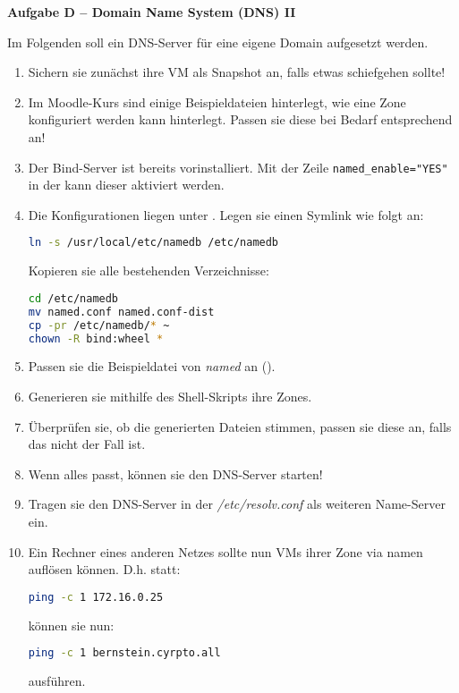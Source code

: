 \documentclass[paper=a4,fontsize=11pt]{scrartcl}%
\numberwithin{equation}{section}
\begin{document}
\begin{center}\Large{\textbf{Aufgabe D -- Domain Name System (DNS) II}}\end{center}\vskip0.25in
Im Folgenden soll ein DNS-Server für eine eigene Domain aufgesetzt werden.
\begin{enumerate}
	\item Sichern sie zunächst ihre VM als Snapshot an, falls etwas schiefgehen sollte!
	\item Im Moodle-Kurs sind einige Beispieldateien hinterlegt, wie eine Zone konfiguriert werden kann hinterlegt. Passen sie diese bei Bedarf entsprechend an!
	\item Der Bind-Server ist bereits vorinstalliert. Mit der Zeile \texttt{named\_enable="YES"} in der  kann dieser aktiviert werden.
	\item Die Konfigurationen liegen unter . Legen sie einen Symlink wie folgt an:
	\begin{lstlisting}[style=Bash, language=Bash]
ln -s /usr/local/etc/namedb /etc/namedb
		\end{lstlisting}
		Kopieren sie alle bestehenden Verzeichnisse:
		\begin{lstlisting}[style=Bash, language=Bash]
cd /etc/namedb
mv named.conf named.conf-dist
cp -pr /etc/namedb/* ~
chown -R bind:wheel * 
		\end{lstlisting}
		\item Passen sie die Beispieldatei von \emph{named} an ().
		\item Generieren sie mithilfe des Shell-Skripts  ihre Zones.
		\item Überprüfen sie, ob die generierten Dateien stimmen, passen sie diese an, falls das nicht der Fall ist.
		\item Wenn alles passt, können sie den DNS-Server starten!
		\item Tragen sie den DNS-Server in der \emph{/etc/resolv.conf} als weiteren Name-Server ein.
		\item Ein Rechner eines anderen Netzes sollte nun VMs ihrer Zone via namen auflösen können. D.h. statt:
		\begin{lstlisting}[style=Bash, language=Bash]
ping -c 1 172.16.0.25 
		\end{lstlisting}
		können sie nun:
		\begin{lstlisting}[style=Bash, language=Bash]
ping -c 1 bernstein.cyrpto.all
		\end{lstlisting}
		ausführen.
\end{enumerate}
\end{document}
